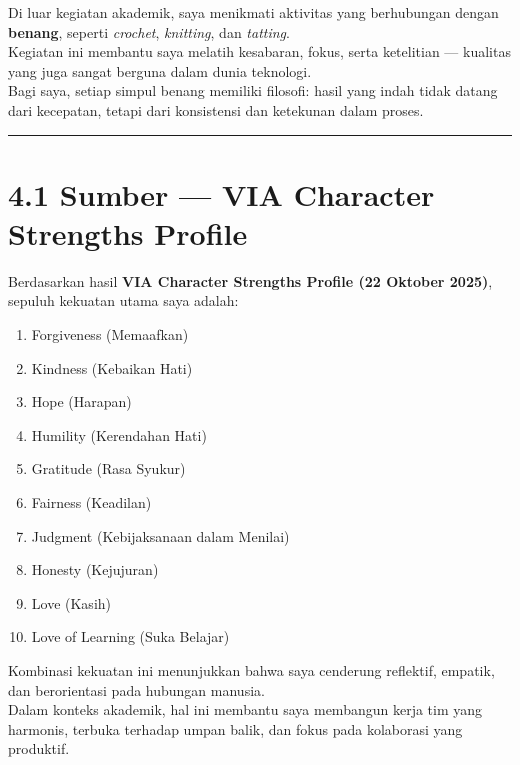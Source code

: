 \documentclass[
  letterpaper,
  DIV=11,
  numbers=noendperiod]{scrreprt}
\providecommand{\tightlist}{%
  \setlength{\itemsep}{0pt}\setlength{\parskip}{0pt}}
\begin{document}
Di luar kegiatan akademik, saya menikmati aktivitas yang berhubungan
dengan \textbf{benang}, seperti \emph{crochet}, \emph{knitting}, dan
\emph{tatting}.\\
Kegiatan ini membantu saya melatih kesabaran, fokus, serta ketelitian
--- kualitas yang juga sangat berguna dalam dunia teknologi.\\
Bagi saya, setiap simpul benang memiliki filosofi: hasil yang indah
tidak datang dari kecepatan, tetapi dari konsistensi dan ketekunan dalam
proses.

\begin{center}\rule{0.5\linewidth}{0.5pt}\end{center}

\section{4.1 Sumber --- VIA Character Strengths
Profile}\label{sumber-via-character-strengths-profile}

Berdasarkan hasil \textbf{VIA Character Strengths Profile (22 Oktober
2025)}, sepuluh kekuatan utama saya adalah:

\begin{enumerate}
\def\labelenumi{\arabic{enumi}.}
\tightlist
\item
  Forgiveness (Memaafkan)\\
\item
  Kindness (Kebaikan Hati)\\
\item
  Hope (Harapan)\\
\item
  Humility (Kerendahan Hati)\\
\item
  Gratitude (Rasa Syukur)\\
\item
  Fairness (Keadilan)\\
\item
  Judgment (Kebijaksanaan dalam Menilai)\\
\item
  Honesty (Kejujuran)\\
\item
  Love (Kasih)\\
\item
  Love of Learning (Suka Belajar)
\end{enumerate}

Kombinasi kekuatan ini menunjukkan bahwa saya cenderung reflektif,
empatik, dan berorientasi pada hubungan manusia.\\
Dalam konteks akademik, hal ini membantu saya membangun kerja tim yang
harmonis, terbuka terhadap umpan balik, dan fokus pada kolaborasi yang
produktif.
\end{document}
